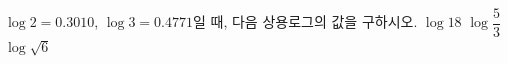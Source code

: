 $\log 2=0.3010$, $\log 3=0.4771$일 때, 다음 상용로그의 값을 구하시오.
 $\log 18$
 $\log\dfrac{5}{3}$
 $\log\sqrt{6}$
